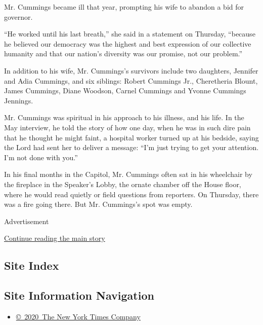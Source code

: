 Mr. Cummings became ill that year, prompting his wife to abandon a bid
for governor.

``He worked until his last breath,'' she said in a statement on
Thursday, ``because he believed our democracy was the highest and best
expression of our collective humanity and that our nation's diversity
was our promise, not our problem.''

In addition to his wife, Mr. Cummings's survivors include two daughters,
Jennifer and Adia Cummings, and six siblings: Robert Cummings Jr.,
Cheretheria Blount, James Cummings, Diane Woodson, Carnel Cummings and
Yvonne Cummings Jennings.

Mr. Cummings was spiritual in his approach to his illness, and his life.
In the May interview, he told the story of how one day, when he was in
such dire pain that he thought he might faint, a hospital worker turned
up at his bedside, saying the Lord had sent her to deliver a message:
``I'm just trying to get your attention. I'm not done with you.''

In his final months in the Capitol, Mr. Cummings often sat in his
wheelchair by the fireplace in the Speaker's Lobby, the ornate chamber
off the House floor, where he would read quietly or field questions from
reporters. On Thursday, there was a fire going there. But Mr. Cummings's
spot was empty.

Advertisement

\protect\hyperlink{after-bottom}{Continue reading the main story}

\hypertarget{site-index}{%
\subsection{Site Index}\label{site-index}}

\hypertarget{site-information-navigation}{%
\subsection{Site Information
Navigation}\label{site-information-navigation}}

\begin{itemize}
\tightlist
\item
  \href{https://help.nytimes3xbfgragh.onion/hc/en-us/articles/115014792127-Copyright-notice}{©~2020~The
  New York Times Company}
\end{itemize}

